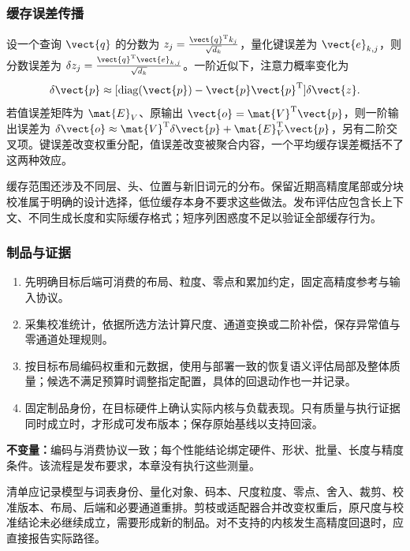 \documentclass[../textbook.tex]{subfiles}
\begin{document}
\subsubsection{缓存误差传播}
设一个查询 $\vect{q}$ 的分数为 $z_j=\frac{\vect{q}^{\mathrm{T}}k_j}{\sqrt{d_k}}$，量化键误差为 $\vect{e}_{k,j}$，则分数误差为 $\delta z_j=\frac{\vect{q}^{\mathrm{T}}\vect{e}_{k,j}}{\sqrt{d_k}}$。一阶近似下，注意力概率变化为
\begin{equation}
\delta \vect{p}\approx[\operatorname{diag}(\vect{p})-\vect{p}\vect{p}^{\mathrm{T}}]\delta \vect{z}.
\end{equation}
若值误差矩阵为 $\mat{E}_V$、原输出 $\vect{o}=\mat{V}^{\mathrm{T}}\vect{p}$，则一阶输出误差为 $\delta \vect{o}\approx \mat{V}^{\mathrm{T}}\delta \vect{p}+\mat{E}_V^{\mathrm{T}}\vect{p}$，另有二阶交叉项。键误差改变权重分配，值误差改变被聚合内容，一个平均缓存误差概括不了这两种效应。

缓存范围还涉及不同层、头、位置与新旧词元的分布。保留近期高精度尾部或分块校准属于明确的设计选择，低位缓存本身不要求这些做法。发布评估应包含长上下文、不同生成长度和实际缓存格式；短序列困惑度不足以验证全部缓存行为。

\subsubsection{制品与证据}
\begin{algorithm}[量化制品的形成]
\begin{enumerate}
\item 先明确目标后端可消费的布局、粒度、零点和累加约定，固定高精度参考与输入协议。
\item 采集校准统计，依据所选方法计算尺度、通道变换或二阶补偿，保存异常值与零通道处理规则。
\item 按目标布局编码权重和元数据，使用与部署一致的恢复语义评估局部及整体质量；候选不满足预算时调整指定配置，具体的回退动作也一并记录。
\item 固定制品身份，在目标硬件上确认实际内核与负载表现。只有质量与执行证据同时成立时，才形成可发布版本；保存原始基线以支持回滚。
\end{enumerate}
\textbf{不变量：}编码与消费协议一致；每个性能结论绑定硬件、形状、批量、长度与精度条件。该流程是发布要求，本章没有执行这些测量。
\end{algorithm}

清单应记录模型与词表身份、量化对象、码本、尺度粒度、零点、舍入、裁剪、校准版本、布局、后端和必要通道重排。剪枝或适配器合并改变权重后，原尺度与校准结论未必继续成立，需要形成新的制品。对不支持的内核发生高精度回退时，应直接报告实际路径。
\end{document}
